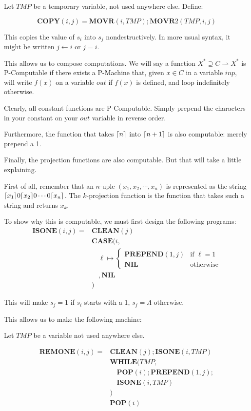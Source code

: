 \documentclass{article}
\DeclarePairedDelimiter{\ceil}{\lceil}{\rceil}
\newcommand{\NIL}{\mathbf{NIL}}
\newcommand{\PREPEND}{\mathbf{PREPEND}}
\newcommand{\POP}{\mathbf{POP}}
\newcommand{\CASE}{\mathbf{CASE}}
\newcommand{\WHILE}{\mathbf{WHILE}}
\newcommand{\CLEAN}{\mathbf{CLEAN}}
\newcommand{\MOVR}{\mathbf{MOVR}}
\newcommand{\COPY}{\mathbf{COPY}}
\newcommand{\REMONE}{\mathbf{REMONE}}
\begin{document}
	Let $TMP$ be a temporary variable, not used anywhere else. Define:
	
	\[\COPY(i, j) = \MOVR(i, TMP); \MOVR2(TMP, i, j)\]
	
	This copies the value of $s_i$ into $s_j$ nondestructively. In more usual syntax, it might be written $j \leftarrow i$ or $j = i$.
	
	This allows us to compose computations. We will say a function $X^* \supseteq C \rightharpoonup X^*$ is P-Computable if there exists a P-Machine that, given $x \in C$ in a variable $inp$, will write $f(x)$ on a variable $out$ if $f(x)$ is defined, and loop indefinitely otherwise.
	
	Clearly, all constant functions are P-Computable. Simply prepend the characters in your constant on your $out$ variable in reverse order.
	
	Furthermore, the function that takes $\ceil{n}$ into $\ceil{n+1}$ is also computable: merely prepend a 1.
	
	Finally, the projection functions are also computable. But that will take a little explaining.
	
	First of all, remember that an $n$-uple $(x_1, x_2, \cdots, x_n)$ is represented as the string $\ceil{x_1}0\ceil{x_2}0\cdots0\ceil{x_n}$. The $k$-projection function is the function that takes such a string and returns $x_k$.
	
	To show why this is computable, we must first design the following programs:
	\begin{align*}
	\mathbf{ISONE}(i, j) =&\CLEAN(j)\\
	&\CASE(i,\\
	&\quad \ell \mapsto
	\begin{cases}
	\PREPEND(1, j) &\text{if $\ell = 1$}\\
	\NIL &\text{otherwise}
	\end{cases}\\
	&\quad ,\NIL\\
	&)
	\end{align*}
	
	This will make $s_j = 1$ if $s_i$ starts with a 1, $s_j = \Lambda$ otherwise.
	
	This allows us to make the following machine:
	
	Let $TMP$ be a variable not used anywhere else.
	
	\begin{align*}
	\REMONE(i, j) =& \CLEAN(j); \mathbf{ISONE}(i, TMP)\\
	&\WHILE(TMP,\\
	&\quad \POP(i); \PREPEND(1, j);\\
	&\quad \mathbf{ISONE}(i, TMP)\\
	&)\\
	&\POP(i)
	\end{align*}
	
\end{document}
